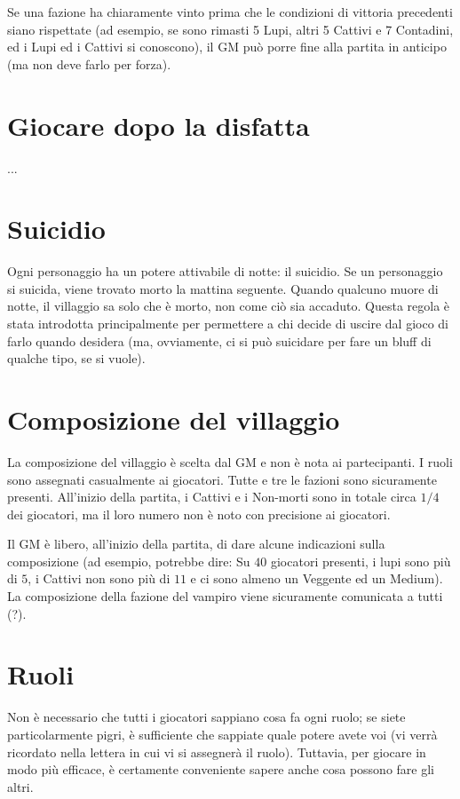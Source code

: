 \documentclass[a4paper,10pt]{article}
\begin{document}
Se una fazione ha chiaramente vinto prima che le condizioni di vittoria precedenti siano rispettate (ad esempio, se sono rimasti 5 Lupi, altri 5 Cattivi e 7 Contadini, ed i Lupi ed i Cattivi si conoscono), il GM può porre fine alla partita in anticipo (ma non deve farlo per forza).


\section{Giocare dopo la disfatta}

...


\section{Suicidio}

Ogni personaggio ha un potere attivabile di notte: il suicidio.
Se un personaggio si suicida, viene trovato morto la mattina seguente. Quando qualcuno muore di notte, il villaggio sa solo che è morto, non come ciò sia accaduto.
Questa regola è stata introdotta principalmente per permettere a chi decide di uscire dal gioco di farlo quando desidera (ma, ovviamente, ci si può suicidare per fare un bluff di qualche tipo, se si vuole).


\section{Composizione del villaggio}

La composizione del villaggio è scelta dal GM e non è nota ai partecipanti. I ruoli sono assegnati casualmente ai giocatori.
Tutte e tre le fazioni sono sicuramente presenti. All'inizio della partita, i Cattivi e i Non-morti sono in totale circa $1/4$ dei giocatori, ma il loro numero non è noto con precisione ai giocatori.

Il GM è libero, all'inizio della partita, di dare alcune indicazioni sulla composizione (ad esempio, potrebbe dire: Su $40$ giocatori presenti, i lupi sono più di $5$, i Cattivi non sono più di $11$ e ci sono almeno un Veggente ed un Medium). La composizione della fazione del vampiro viene sicuramente comunicata a tutti (?).


\section{Ruoli}

Non è necessario che tutti i giocatori sappiano cosa fa ogni ruolo; se siete particolarmente pigri, è sufficiente che sappiate quale potere avete voi (vi verrà ricordato nella lettera in cui vi si assegnerà il ruolo). Tuttavia, per giocare in modo più efficace, è certamente conveniente sapere anche cosa possono fare gli altri.
\end{document}
